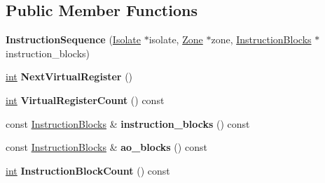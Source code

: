 \subsection*{Public Member Functions}
\begin{DoxyCompactItemize}
\item 
\mbox{\label{classv8_1_1internal_1_1compiler_1_1InstructionSequence_aae3d24f3e9291a4e9aeb97c6d6b074c9}} 
{\bfseries Instruction\+Sequence} (\mbox{\hyperlink{classv8_1_1internal_1_1Isolate}{Isolate}} $\ast$isolate, \mbox{\hyperlink{classv8_1_1internal_1_1Zone}{Zone}} $\ast$zone, \mbox{\hyperlink{classv8_1_1internal_1_1ZoneVector}{Instruction\+Blocks}} $\ast$instruction\+\_\+blocks)
\item 
\mbox{\label{classv8_1_1internal_1_1compiler_1_1InstructionSequence_aad92360c5302421950fd346e8d55b8e7}} 
\mbox{\hyperlink{classint}{int}} {\bfseries Next\+Virtual\+Register} ()
\item 
\mbox{\label{classv8_1_1internal_1_1compiler_1_1InstructionSequence_a3111e0f702c76e9aceb6c39cc0a6672b}} 
\mbox{\hyperlink{classint}{int}} {\bfseries Virtual\+Register\+Count} () const
\item 
\mbox{\label{classv8_1_1internal_1_1compiler_1_1InstructionSequence_ac2275233b0810699e6c49be347dbaaed}} 
const \mbox{\hyperlink{classv8_1_1internal_1_1ZoneVector}{Instruction\+Blocks}} \& {\bfseries instruction\+\_\+blocks} () const
\item 
\mbox{\label{classv8_1_1internal_1_1compiler_1_1InstructionSequence_a5e1382ead8e78b4d18e7933099b6fc9e}} 
const \mbox{\hyperlink{classv8_1_1internal_1_1ZoneVector}{Instruction\+Blocks}} \& {\bfseries ao\+\_\+blocks} () const
\item 
\mbox{\label{classv8_1_1internal_1_1compiler_1_1InstructionSequence_a290f73b7103077a4963979d30c773e48}} 
\mbox{\hyperlink{classint}{int}} {\bfseries Instruction\+Block\+Count} () const
\item 
\mbox{\label{classv8_1_1internal_1_1compiler_1_1InstructionSequence_a9c3aecd79b289855c043cc27c2749b35}} 

\end{DoxyCompactItemize}

